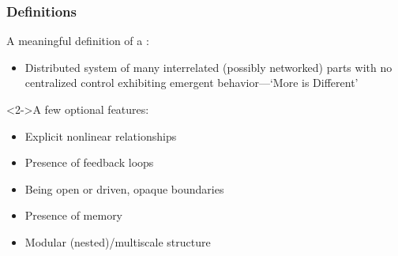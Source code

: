 \begin{frame}
  \frametitle{Definitions}


  \begin{block}{A meaningful definition of a :}
    \begin{itemize}
    \item<1->
      Distributed system of many interrelated (possibly networked) parts
      with no centralized control
      exhibiting 
      emergent behavior---`More is Different'\cite{anderson1972a}
    \end{itemize}    
  \end{block}

  \begin{block}<2->{A few optional features:}
    \begin{itemize}
    \item<2->
      Explicit nonlinear relationships
    \item<2->
      Presence of feedback loops
    \item<2->
      Being open or driven, opaque boundaries
    \item<2->
      Presence of memory
    \item<2->
      Modular (nested)/multiscale structure
    \end{itemize}
  \end{block}

\end{frame}


